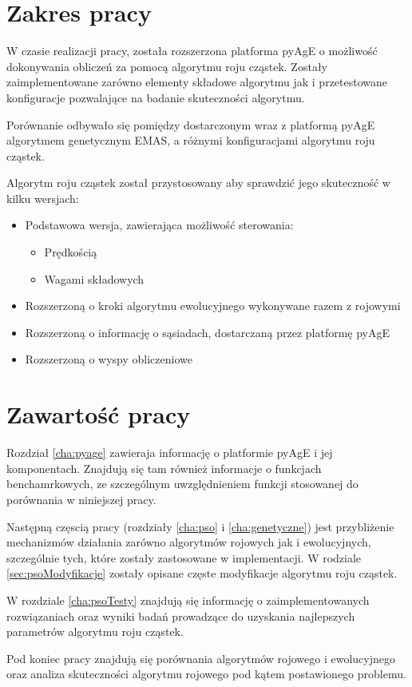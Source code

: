 \section{Zakres pracy}
W czasie realizacji pracy, została rozszerzona platforma pyAgE o możliwość dokonywania obliczeń za pomocą algorytmu roju cząstek. Zostały zaimplementowane zarówno elementy składowe algorytmu jak i przetestowane konfiguracje pozwalające na badanie skuteczności algorytmu. 

Porównanie odbywało się pomiędzy dostarczonym wraz z platformą pyAgE algorytmem genetycznym EMAS, a różnymi konfiguracjami algorytmu roju cząstek. 

Algorytm roju cząstek został przystosowany aby sprawdzić jego skuteczność w kilku wersjach:
\begin{itemize}
\item Podstawowa wersja, zawierająca możliwość sterowania:
\begin{itemize}
\item Prędkością
\item Wagami składowych
\end{itemize}
\item Rozszerzoną o kroki algorytmu ewolucyjnego wykonywane razem z rojowymi
\item Rozszerzoną o informację o sąsiadach, dostarczaną przez platformę pyAgE
\item Rozszerzoną o wyspy obliczeniowe
\end{itemize}


\section{Zawartość pracy}
Rozdział \ref{cha:pyage} zawieraja informację o platformie pyAgE i jej komponentach. Znajdują się tam również informacje o funkcjach benchamrkowych, ze szczególnym uwzględnieniem funkcji stosowanej do porównania w niniejszej pracy.

Następną częscią pracy (rozdziały \ref{cha:pso} i \ref{cha:genetyczne}) jest przybliżenie mechanizmów działania zarówno algorytmów rojowych jak i ewolucyjnych, szczególnie tych, które zostały zastosowane w implementacji. W rodziale \ref{sec:psoModyfikacje} zostały opisane częste modyfikacje algorytmu roju cząstek.

W rozdziale \ref{cha:psoTesty} znajdują się informację o zaimplementowanych rozwiązaniach oraz wyniki badań prowadzące do uzyskania najlepszych parametrów algorytmu roju cząstek.

Pod koniec pracy znajdują się porównania algorytmów rojowego i ewolucyjnego oraz analiza skuteczności algorytmu rojowego pod kątem postawionego problemu.












